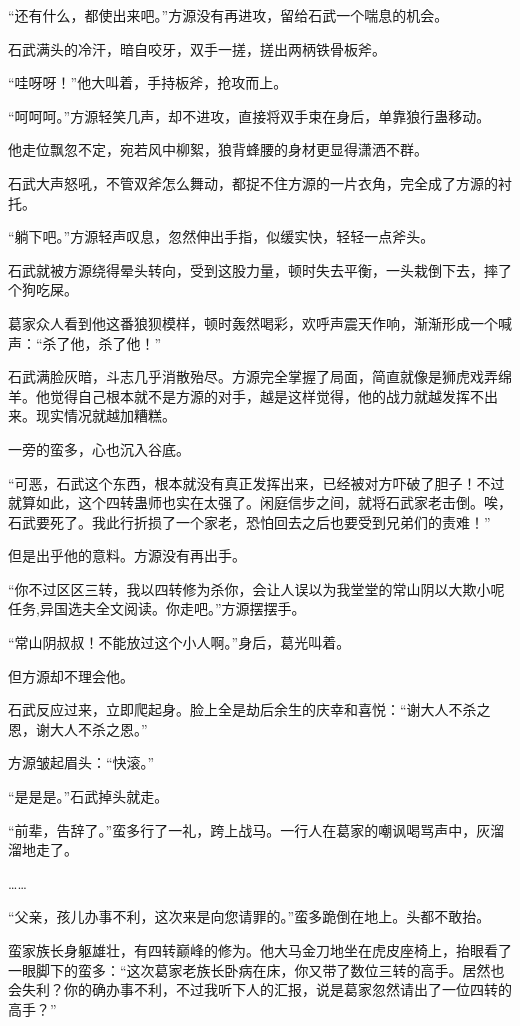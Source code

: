 \begin{this_body}
“还有什么，都使出来吧。”方源没有再进攻，留给石武一个喘息的机会。

石武满头的冷汗，暗自咬牙，双手一搓，搓出两柄铁骨板斧。

“哇呀呀！”他大叫着，手持板斧，抢攻而上。

“呵呵呵。”方源轻笑几声，却不进攻，直接将双手束在身后，单靠狼行蛊移动。

他走位飘忽不定，宛若风中柳絮，狼背蜂腰的身材更显得潇洒不群。

石武大声怒吼，不管双斧怎么舞动，都捉不住方源的一片衣角，完全成了方源的衬托。

“躺下吧。”方源轻声叹息，忽然伸出手指，似缓实快，轻轻一点斧头。

石武就被方源绕得晕头转向，受到这股力量，顿时失去平衡，一头栽倒下去，摔了个狗吃屎。

葛家众人看到他这番狼狈模样，顿时轰然喝彩，欢呼声震天作响，渐渐形成一个喊声：“杀了他，杀了他！”

石武满脸灰暗，斗志几乎消散殆尽。方源完全掌握了局面，简直就像是狮虎戏弄绵羊。他觉得自己根本就不是方源的对手，越是这样觉得，他的战力就越发挥不出来。现实情况就越加糟糕。

一旁的蛮多，心也沉入谷底。

“可恶，石武这个东西，根本就没有真正发挥出来，已经被对方吓破了胆子！不过就算如此，这个四转蛊师也实在太强了。闲庭信步之间，就将石武家老击倒。唉，石武要死了。我此行折损了一个家老，恐怕回去之后也要受到兄弟们的责难！”

但是出乎他的意料。方源没有再出手。

“你不过区区三转，我以四转修为杀你，会让人误以为我堂堂的常山阴以大欺小呢任务,异国选夫全文阅读。你走吧。”方源摆摆手。

“常山阴叔叔！不能放过这个小人啊。”身后，葛光叫着。

但方源却不理会他。

石武反应过来，立即爬起身。脸上全是劫后余生的庆幸和喜悦：“谢大人不杀之恩，谢大人不杀之恩。”

方源皱起眉头：“快滚。”

“是是是。”石武掉头就走。

“前辈，告辞了。”蛮多行了一礼，跨上战马。一行人在葛家的嘲讽喝骂声中，灰溜溜地走了。

……

“父亲，孩儿办事不利，这次来是向您请罪的。”蛮多跪倒在地上。头都不敢抬。

蛮家族长身躯雄壮，有四转巅峰的修为。他大马金刀地坐在虎皮座椅上，抬眼看了一眼脚下的蛮多：“这次葛家老族长卧病在床，你又带了数位三转的高手。居然也会失利？你的确办事不利，不过我听下人的汇报，说是葛家忽然请出了一位四转的高手？”


\end{this_body}
